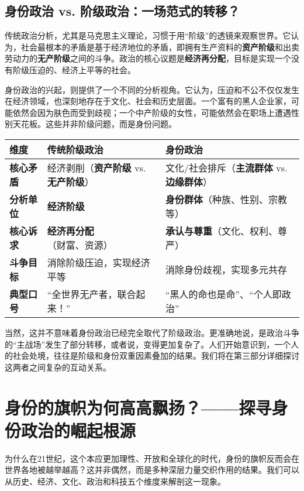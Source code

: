 \subsection{身份政治 vs. 阶级政治：一场范式的转移？}

传统政治分析，尤其是马克思主义理论，习惯于用“阶级”的透镜来观察世界。它认为，社会最根本的矛盾是基于经济地位的矛盾，即拥有生产资料的\textbf{资产阶级}和出卖劳动力的\textbf{无产阶级}之间的斗争。政治的核心议题是\textbf{经济再分配}，目标是实现一个没有阶级压迫的、经济上平等的社会。

身份政治的兴起，则提供了一个不同的分析视角。它认为，压迫和不公不仅仅发生在经济领域，也深刻地存在于文化、社会和历史层面。一个富有的黑人企业家，可能依然会因为肤色而受到歧视；一个中产阶级的女性，可能依然会在职场上遭遇性别天花板。这些并非阶级问题，而是身份问题。

\begin{tabular}{|l|l|l|}
\hline
\textbf{维度} & \textbf{传统阶级政治} & \textbf{身份政治} \\
\hline
\textbf{核心矛盾} & 经济剥削（\textbf{资产阶级} vs. \textbf{无产阶级}） & 文化/社会排斥（\textbf{主流群体} vs. \textbf{边缘群体}） \\
\hline
\textbf{分析单位} & \textbf{经济阶级} & \textbf{身份群体}（种族、性别、宗教等） \\
\hline
\textbf{核心诉求} & \textbf{经济再分配}（财富、资源） & \textbf{承认与尊重}（文化、权利、尊严） \\
\hline
\textbf{斗争目标} & 消除阶级压迫，实现经济平等 & 消除身份歧视，实现多元共存 \\
\hline
\textbf{典型口号} & “全世界无产者，联合起来！” & “黑人的命也是命”、“个人即政治” \\
\hline
\end{tabular}

当然，这并不意味着身份政治已经完全取代了阶级政治。更准确地说，是政治斗争的“主战场”发生了部分转移，或者说，变得更加复杂了。人们开始意识到，一个人的社会处境，往往是阶级和身份双重因素叠加的结果。我们将在第三部分详细探讨这两者之间复杂的互动关系。

\section{ 身份的旗帜为何高高飘扬？——探寻身份政治的崛起根源}

为什么在21世纪，这个本应更加理性、开放和全球化的时代，身份的旗帜反而会在世界各地被越举越高？这并非偶然，而是多种深层力量交织作用的结果。我们可以从历史、经济、文化、政治和科技五个维度来解剖这一现象。

